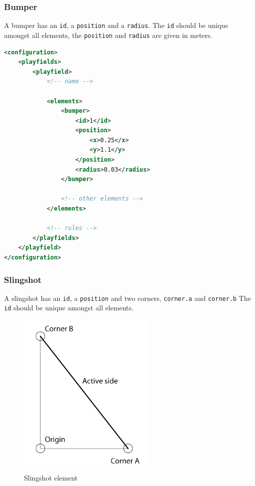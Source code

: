 \documentclass[fontsize=12pt,
               paper=a4,
               twoside=false,
               parskip=half,
               ]{scrartcl}
\begin{document}
\subsubsection{Bumper}

A bumper has an \texttt{id}, a \texttt{position} and a \texttt{radius}. The \texttt{id} should be unique amongst all elements, the \texttt{position} and \texttt{radius} are given in meters.

\begin{lstlisting}[language=xml,label=lst:bumper,caption={bumper}]
<configuration>
	<playfields>
		<playfield>
			<!-- name -->
			
			<elements>
				<bumper>
					<id>1</id>
					<position>
						<x>0.25</x>
						<y>1.1</y>
					</position>
					<radius>0.03</radius>
				</bumper>
				
				<!-- other elements -->
			</elements>
			
			<!-- rules -->
		</playfields>
	</playfield>
</configuration>
\end{lstlisting}

\subsubsection{Slingshot}

A slingshot has an \texttt{id}, a \texttt{position} and two corners, \texttt{corner.a} and \texttt{corner.b} The \texttt{id} should be unique amongst all elements. 

\begin{figure}[h!]
	\centering
	\includegraphics[height=8cm]{./img/manual/slingshot-element.png}
	\caption[Slingshot element]{Slingshot element}
	\label{fig:slingshot_element}
\end{figure}
\end{document}
